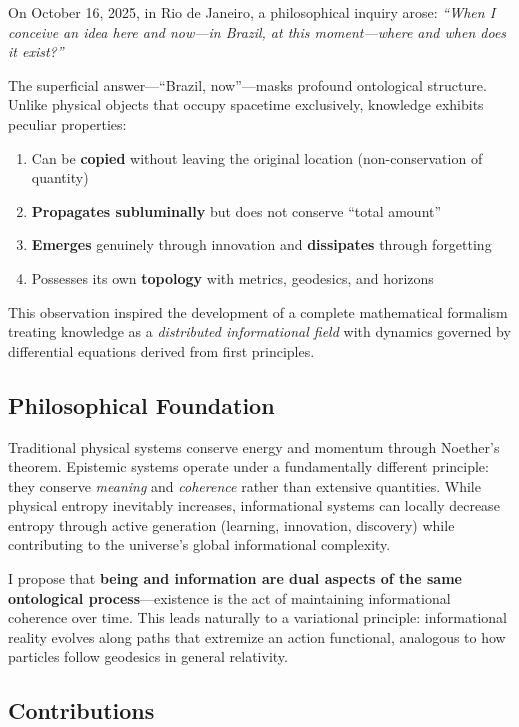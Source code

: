 \documentclass[12pt]{article}
\begin{document}
On October 16, 2025, in Rio de Janeiro, a philosophical inquiry arose: \emph{``When I conceive an idea here and now---in Brazil, at this moment---where and when does it exist?''}

The superficial answer---``Brazil, now''---masks profound ontological structure. Unlike physical objects that occupy spacetime exclusively, knowledge exhibits peculiar properties:
\begin{enumerate}
    \item Can be \textbf{copied} without leaving the original location (non-conservation of quantity)
    \item \textbf{Propagates subluminally} but does not conserve ``total amount''
    \item \textbf{Emerges} genuinely through innovation and \textbf{dissipates} through forgetting
    \item Possesses its own \textbf{topology} with metrics, geodesics, and horizons
\end{enumerate}

This observation inspired the development of a complete mathematical formalism treating knowledge as a \emph{distributed informational field} with dynamics governed by differential equations derived from first principles.

\subsection{Philosophical Foundation}

Traditional physical systems conserve energy and momentum through Noether's theorem. Epistemic systems operate under a fundamentally different principle: they conserve \emph{meaning} and \emph{coherence} rather than extensive quantities. While physical entropy inevitably increases, informational systems can locally decrease entropy through active generation (learning, innovation, discovery) while contributing to the universe's global informational complexity.

I propose that \textbf{being and information are dual aspects of the same ontological process}---existence is the act of maintaining informational coherence over time. This leads naturally to a variational principle: informational reality evolves along paths that extremize an action functional, analogous to how particles follow geodesics in general relativity.

\subsection{Contributions}
\end{document}

